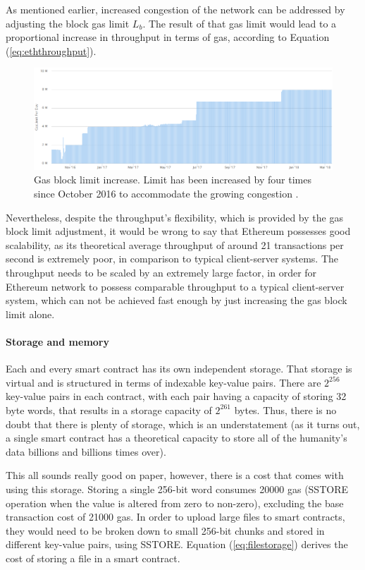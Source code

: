 As mentioned earlier, increased congestion of the network can be addressed by adjusting the block gas limit $L_b$. The result of that gas limit would lead to a proportional increase in throughput in terms of gas, according to Equation (\ref{eq:eththroughput}).

\begin{figure}[H]
\centering
\includegraphics[scale=0.49]{images/gasblocklimit.png}
\caption{Gas block limit increase. Limit has been increased by four times since October 2016 to accommodate the growing congestion \textnormal{\citep{ethgaslimit}}.}
\label{fig:ethergasblocklimit}
\end{figure}

Nevertheless, despite the throughput's flexibility, which is provided by the gas block limit adjustment, it would be wrong to say that Ethereum possesses good scalability, as its theoretical average throughput of around 21 transactions per second is extremely poor, in comparison to typical client-server systems. The throughput needs to be scaled by an extremely large factor, in order for Ethereum network to possess comparable throughput to a typical client-server system, which can not be achieved fast enough by just increasing the gas block limit alone. 

\paragraph{Storage and memory}
Each and every smart contract has its own independent storage. That storage is virtual and is structured in terms of indexable key-value pairs. There are $2^{256}$ key-value pairs in each contract, with each pair having a capacity of storing 32 byte words, that results in a storage capacity of $2^{261}$ bytes. Thus, there is no doubt that there is plenty of storage, which is an understatement (as it turns out, a single smart contract has a theoretical capacity to store all of the humanity's data billions and billions times over).

This all sounds really good on paper, however, there is a cost that comes with using this storage. Storing a single 256-bit word consumes 20000 gas ({\small SSTORE} operation when the value is altered from zero to non-zero), excluding the base transaction cost of 21000 gas. In order to upload large files to smart contracts, they would need to be broken down to small 256-bit chunks and stored in different key-value pairs, using {\small SSTORE}. Equation (\ref{eq:filestorage}) derives the cost of storing a file in a smart contract.

